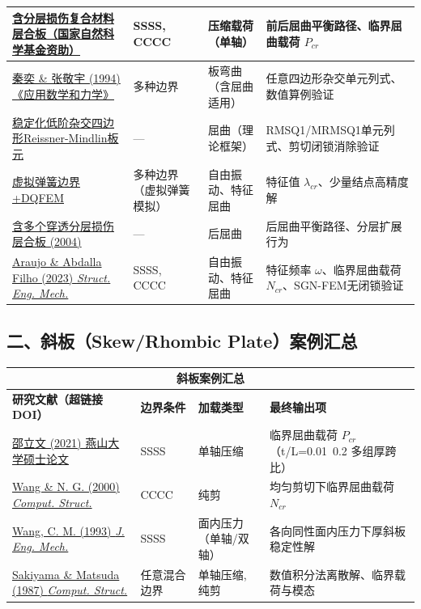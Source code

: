 \documentclass[12pt,a4paper]{article}
\begin{document}
{\begin{longtable}{|p{5.2cm}|p{1.8cm}|p{2.0cm}|p{5.2cm}|}
\hline
\href{https://www.cnki.net/}{含分层损伤复合材料层合板（国家自然科学基金资助）} & SSSS, CCCC & 压缩载荷（单轴） & 前后屈曲平衡路径、临界屈曲载荷 $P_{cr}$ \\
\hline
\href{https://doi.org/10.1007/BF02451054}{秦奕 \& 张敬宇 (1994) 《应用数学和力学》} & 多种边界 & 板弯曲（含屈曲适用） & 任意四边形杂交单元列式、数值算例验证 \\
\hline
\href{https://www.cnki.net/}{稳定化低阶杂交四边形Reissner-Mindlin板元} & --- & 屈曲（理论框架） & RMSQ1/MRMSQ1单元列式、剪切闭锁消除验证 \\
\hline
\href{https://www.cnki.net/}{虚拟弹簧边界+DQFEM} & 多种边界（虚拟弹簧模拟） & 自由振动、特征屈曲 & 特征值 $\lambda_{cr}$、少量结点高精度解 \\
\hline
\href{https://www.cnki.net/}{含多个穿透分层损伤层合板 (2004)} & --- & 后屈曲 & 后屈曲平衡路径、分层扩展行为 \\
\hline
\href{https://doi.org/10.12989/sem.2023.87.3.283}{Araujo \& Abdalla Filho (2023) \emph{Struct. Eng. Mech.}} & SSSS, CCCC & 自由振动、特征屈曲 & 特征频率 $\omega$、临界屈曲载荷 $N_{cr}$、SGN-FEM无闭锁验证 \\
\hline
\bottomrule
\end{longtable}
}

\subsection*{二、斜板（Skew/Rhombic Plate）案例汇总}

{\small
\setlength{\tabcolsep}{3.5pt}
\begin{longtable}{|p{5.2cm}|p{1.8cm}|p{2.0cm}|p{5.2cm}|}
\hline
\multicolumn{4}{|c|}{斜板案例汇总} \\
\hline
\textbf{研究文献（超链接DOI）} & \textbf{边界条件} & \textbf{加载类型} & \textbf{最终输出项} \\
\hline
\endhead
\href{https://www.cnki.net/}{邵立文 (2021) 燕山大学硕士论文} & SSSS & 单轴压缩 & 临界屈曲载荷 $P_{cr}$（t/L=0.01~0.2 多组厚跨比） \\
\hline
\href{https://doi.org/10.1016/S0045-7949(99)00050-9}{Wang \& N. G. (2000) \emph{Comput. Struct.}} & CCCC & 纯剪 & 均匀剪切下临界屈曲载荷 $N_{cr}$ \\
\hline
\href{https://doi.org/10.1061/(ASCE)0733-9399(1993)119:1(1)}{Wang, C. M. (1993) \emph{J. Eng. Mech.}} & SSSS & 面内压力（单轴/双轴） & 各向同性面内压力下厚斜板稳定性解 \\
\hline
\href{https://doi.org/10.1016/0045-7949(87)90172-6}{Sakiyama \& Matsuda (1987) \emph{Comput. Struct.}} & 任意混合边界 & 单轴压缩, 纯剪 & 数值积分法离散解、临界载荷与模态 \\
\hline
\bottomrule
\end{longtable}
}
\end{document}
